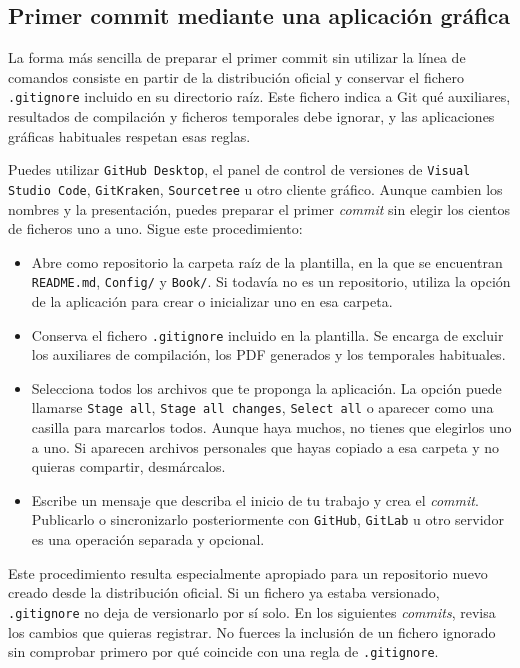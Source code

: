 \subsection{Primer commit mediante una aplicación gráfica}
\label{sec:primer-commit-grafico}

La forma más sencilla de preparar el primer commit sin utilizar la línea de comandos consiste en partir de la distribución oficial y conservar el fichero \texttt{.gitignore} incluido en su directorio raíz. Este fichero indica a Git qué auxiliares, resultados de compilación y ficheros temporales debe ignorar, y las aplicaciones gráficas habituales respetan esas reglas.

Puedes utilizar \texttt{GitHub Desktop}, el panel de control de versiones de \texttt{Visual Studio Code}, \texttt{GitKraken}, \texttt{Sourcetree} u otro cliente gráfico. Aunque cambien los nombres y la presentación, puedes preparar el primer \emph{commit} sin elegir los cientos de ficheros uno a uno. Sigue este procedimiento:

\begin{itemize}
  \item Abre como repositorio la carpeta raíz de la plantilla, en la que se encuentran \texttt{README.md}, \texttt{Config/} y \texttt{Book/}. Si todavía no es un repositorio, utiliza la opción de la aplicación para crear o inicializar uno en esa carpeta.
  \item Conserva el fichero \texttt{.gitignore} incluido en la plantilla. Se encarga de excluir los auxiliares de compilación, los PDF generados y los temporales habituales.
  \item Selecciona todos los archivos que te proponga la aplicación. La opción puede llamarse \texttt{Stage all}, \texttt{Stage all changes}, \texttt{Select all} o aparecer como una casilla para marcarlos todos. Aunque haya muchos, no tienes que elegirlos uno a uno. Si aparecen archivos personales que hayas copiado a esa carpeta y no quieras compartir, desmárcalos.
  \item Escribe un mensaje que describa el inicio de tu trabajo y crea el \emph{commit}. Publicarlo o sincronizarlo posteriormente con \texttt{GitHub}, \texttt{GitLab} u otro servidor es una operación separada y opcional.
\end{itemize}

Este procedimiento resulta especialmente apropiado para un repositorio nuevo creado desde la distribución oficial. Si un fichero ya estaba versionado, \texttt{.gitignore} no deja de versionarlo por sí solo. En los siguientes \emph{commits}, revisa los cambios que quieras registrar. No fuerces la inclusión de un fichero ignorado sin comprobar primero por qué coincide con una regla de \texttt{.gitignore}.

